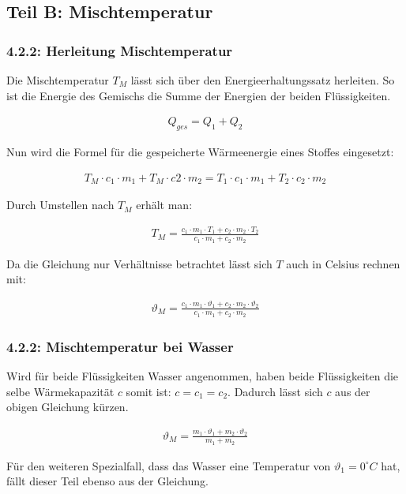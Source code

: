 \documentclass[a4paper]{scrartcl}
\numberwithin{equation}{subsection}
\begin{document}
\subsection{Teil B: Mischtemperatur}
\subsubsection{4.2.2: Herleitung Mischtemperatur}

Die Mischtemperatur $T_M$ lässt sich über den Energieerhaltungssatz herleiten. So ist die Energie des Gemischs die Summe der Energien der beiden Flüssigkeiten.

\begin{align*}
Q_{\textit{ges}} = Q_1 + Q_2
\end{align*}

Nun wird die Formel für die gespeicherte Wärmeenergie eines Stoffes eingesetzt:

\begin{align}
T_M \cdot c_1 \cdot m_1 + T_M \cdot c2 \cdot m_2 = T_1 \cdot c_1 \cdot m_1 + T_2 \cdot c_2 \cdot m_2
\end{align}

Durch Umstellen nach $T_M$ erhält man:

\begin{align}
T_M = \frac{c_1 \cdot m_1 \cdot T_1 + c_2 \cdot m_2 \cdot T_2}{c_1 \cdot m_1 + c_2 \cdot m_2}
\end{align}

Da die Gleichung nur Verhältnisse betrachtet lässt sich $T$ auch in Celsius rechnen mit:

\begin{align}
\vartheta_M = \frac{c_1 \cdot m_1 \cdot \vartheta_1 + c_2 \cdot m_2 \cdot \vartheta_2}{c_1 \cdot m_1 + c_2 \cdot m_2}
\end{align}

\subsubsection{4.2.2: Mischtemperatur bei Wasser}
Wird für beide Flüssigkeiten Wasser angenommen, haben beide Flüssigkeiten die selbe Wärmekapazität $c$ somit ist: $ c = c_1 = c_2$. Dadurch lässt sich $c$ aus der obigen Gleichung kürzen.

\begin{align}
\vartheta_M = \frac{m_1 \cdot \vartheta_1 + m_2 \cdot \vartheta_2}{m_1 + m_2}
\end{align}

Für den weiteren Spezialfall, dass das Wasser eine Temperatur von $\vartheta_1 = 0 ^\circ C$ hat, fällt dieser Teil ebenso aus der Gleichung.
\end{document}

